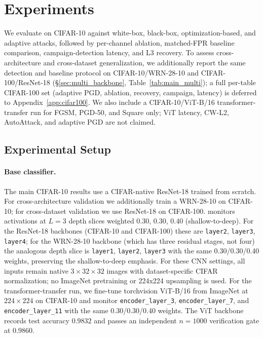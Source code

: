 \section{Experiments}
\label{sec:experiments}

We evaluate \prism on CIFAR-10 against white-box, black-box,
optimization-based, and adaptive attacks, followed by per-channel ablation,
matched-FPR baseline comparison, campaign-detection latency, and L3
recovery. To assess cross-architecture and cross-dataset generalization,
we additionally report the same detection and baseline protocol on
CIFAR-10/WRN-28-10 and CIFAR-100/ResNet-18
(\S\ref{sec:multi_backbone}, Table~\ref{tab:main_multi}); a full per-table
CIFAR-100 set (adaptive PGD, ablation, recovery, campaign, latency) is
deferred to Appendix~\ref{app:cifar100}. We also include a
CIFAR-10/ViT-B/16 transformer-transfer run for FGSM, PGD-50, and Square
only; ViT latency, CW-L2, AutoAttack, and adaptive PGD are not claimed.

\subsection{Experimental Setup}
\label{sec:setup}

\paragraph{Base classifier.}
The main CIFAR-10 results use a CIFAR-native ResNet-18 \cite{he2016deep}
trained from scratch. For cross-architecture validation we additionally
train a WRN-28-10 \cite{zagoruyko2016wide} on CIFAR-10; for cross-dataset
validation we use ResNet-18 on CIFAR-100. \prism monitors activations at
$L=3$ depth slices weighted 0.30, 0.30, 0.40 (shallow-to-deep). For the
ResNet-18 backbones (CIFAR-10 and CIFAR-100) these are \texttt{layer2},
\texttt{layer3}, \texttt{layer4}; for the WRN-28-10 backbone (which has
three residual stages, not four) the analogous depth slice is
\texttt{layer1}, \texttt{layer2}, \texttt{layer3} with the same
0.30/0.30/0.40 weights, preserving the shallow-to-deep emphasis.
For these CNN settings, all inputs remain native $3\times 32\times 32$
images with dataset-specific CIFAR normalization; no ImageNet pretraining
or 224x224 upsampling is used. For the transformer-transfer run, we
fine-tune torchvision ViT-B/16 \cite{dosovitskiy2021image} from
ImageNet \cite{deng2009imagenet} at $224\times224$ on CIFAR-10 and
monitor \texttt{encoder\_layer\_3},
\texttt{encoder\_layer\_7}, and \texttt{encoder\_layer\_11} with the same
0.30/0.30/0.40 weights. The ViT backbone records test accuracy $0.9832$
and passes an independent $n{=}1000$ verification gate at $0.9860$.

